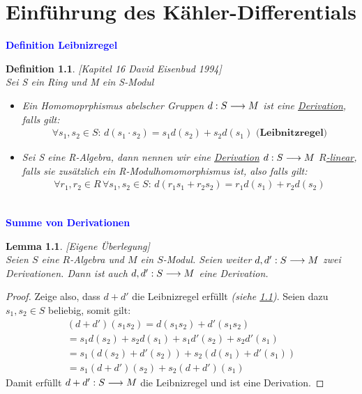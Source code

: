 \documentclass[10pt,a4paper]{report}
\newcommand{\ModulsOfDifferenzials}{David Eisenbud 1994}
\newcounter{Aussage}[chapter]
\newtheorem{lemma}[Aussage]{Lemma}
\newtheorem{definition}[Aussage]{Definition}
\newcommand{\functionfront}[3]{\nolinebreak{#1:#2 \longrightarrow #3}}
\begin{document}
\chapter{Einführung des Kähler-Differentials}

\textcolor{blue}{\textbf{Definition Leibnizregel}}
\begin{definition}\label{Definition Leibnizregel} \textit{[Kapitel 16 \ModulsOfDifferenzials]}\\
Sei S ein Ring und M ein S-Modul
\begin{itemize}
\item[]Ein Homomoprphismus abelscher Gruppen $\functionfront{d}{S}{M}$ ist eine \underline{Derivation}, falls gilt:
\begin{gather*}
\forall s_1,s_2 \in S :\, d(s_1 \cdot s_2) = s_1d(s_2) + s_2d(s_1) \textbf{ (Leibnitzregel)}
\end{gather*}
\item[]Sei S eine R-Algebra, dann nennen wir eine \underline{Derivation} $\functionfront{d}{S}{M}$ \underline{$R$-linear}, falls sie zusätzlich ein R-Modulhomomorphismus ist, also falls gilt:
\begin{gather*}
\forall r_1,r_2 \in R \, \forall s_1,s_2 \in S : \, d(r_1 s_1 + r_2 s_2) = r_1 d(s_1) + r_2 d(s_2)
\end{gather*}
\end{itemize}
\end{definition}


\ \\
\textcolor{blue}{\textbf{Summe von Derivationen}}
\begin{lemma}\label{Summe von Derivationen} \textit{[Eigene Überlegung]} \\
Seien $S$ eine $R$-Algebra und $M$ ein $S$-Modul. Seien weiter $\functionfront{d,d'}{S}{M}$ zwei Derivationen. 
Dann ist auch $\functionfront{d,d'}{S}{M}$ eine Derivation.
\end{lemma}
\begin{proof}
Zeige also, dass $d+d'$ die Leibnizregel erfüllt \textit{(siehe \cref{Definition Leibnizregel})}. Seien dazu $s_1,s_2 \in S$ beliebig, somit gilt:
\begin{gather*}
(d+d')(s_1s_2) 
= d(s_1s_2) + d'(s_1s_2) \\
= s_1d(s_2) + s_2d(s_1) + s_1d'(s_2) + s_2d'(s_1) \\
= s_1 \left( d(s_2) + d'(s_2) \right) + s_2 \left( d(s_1) + d'(s_1) \right) \\
= s_1(d+d')(s_2) + s_2(d+d')(s_1)
\end{gather*}
Damit erfüllt $\functionfront{d+d'}{S}{M}$ die Leibnizregel und ist eine Derivation.
\end{proof}
\end{document}
